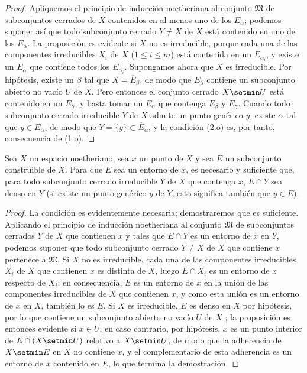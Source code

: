 \documentclass[oneside]{amsart}
\renewcommand{\leq}{\leqslant}
\newcommand{\oldpage}[2][]{{\marginnote{\normalfont\textbf{#1}~|~#2}}\ignorespaces}
\let\EGAOriginalLabel\label
\renewcommand{\label}[1]{\phantomsection\EGAOriginalLabel{#1}}
\begin{document}
\begin{proof}
Apliquemos el principio de inducción noetheriana  al conjunto $\mathfrak{M}$ de subconjuntos cerrados de $X$ contenidos en al menos uno de los $E_\alpha$; podemos suponer así que todo subconjunto cerrado $Y\neq X$ de $X$ está contenido en uno de los $E_\alpha$.
La proposición es evidente si $X$ no es irreducible, porque cada una de las componentes irreducibles $X_i$ de $X$ ($1\leq i\leq m$) está contenida en un $E_{\alpha_i}$, y existe un $E_\alpha$ que contiene todos los $E_{\alpha_i}$.
Supongamos ahora que $X$ es irreducible.
Por hipótesis, existe un $\beta$ tal que $X=\overline{E}_\beta$, de modo que  $E_\beta$ contiene un subconjunto abierto no vacío $U$ de $X$.
Pero entonces el conjunto cerrado $X\setmin U$ está contenido en un $E_\gamma$, y basta tomar un $E_\alpha$ que contenga $E_\beta$ y $E_\gamma$.
Cuando todo subconjunto cerrado irreducible $Y$ de $X$
\oldpage[0\textsubscript{III}]{16}
admite un punto genérico $y$, existe $\alpha$ tal que $y\in E_\alpha$, de modo que $Y=\overline{\{y\}}\subset\overline{E}_\alpha$, y la condición (2.o) es, por tanto, consecuencia de (1.o).
\end{proof}

\begin{proposition}[9.2.5]
\label{0.9.2.5}
Sea $X$ un espacio noetheriano, sea $x$ un punto de $X$ y sea $E$ un subconjunto construible de $X$.
Para que $E$ sea un entorno de $x$, es necesario y suficiente que, para todo subconjunto cerrado irreducible $Y$ de $X$ que contenga $x$, $E\cap Y$ sea denso en $Y$ (si existe un punto genérico $y$ de $Y$, esto significa también \textup{} que $y\in E$).
\end{proposition}

\begin{proof}
La condición es evidentemente necesaria; demostraremos que es suficiente.
Aplicando el principio de inducción noetheriana al conjunto $\mathfrak{M}$ de subconjuntos cerrados $Y$ de $X$ que contienen $x$ y tales que $E\cap Y$ es un entorno de $x$ en $Y$, podemos suponer que todo subconjunto cerrado $Y\neq X$ de $X$ que contiene $x$ pertenece a $\mathfrak{M}$.
Si $X$ no es irreducible, cada una de las componentes irreducibles $X_i$ de $X$ que contienen $x$ es distinta de $X$, luego $E\cap X_i$ es un entorno de $x$ respecto de $X_i$; en consecuencia, $E$ es un entorno de $x$ en la unión de las componentes irreducibles de $X$ que contienen $x$, y como esta unión es un entorno de $x$ en $X$, también lo es $E$.
Si $X$ es irreducible, $E$ es denso en $X$ por hipótesis, por lo que contiene un subconjunto abierto no vacío $U$ de $X$ ; la proposición es entonces evidente si $x\in U$; en caso contrario, por hipótesis, $x$ es un punto interior de $E\cap(X\setmin U)$ relativo a $X\setmin U$, de modo que la adherencia de $X\setmin E$ en $X$ no contiene $x$, y el complementario de esta adherencia es un entorno de $x$ contenido en $E$, lo que termina la demostración.
\end{proof}
\end{document}
